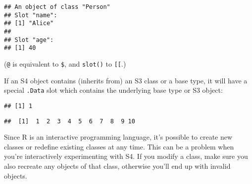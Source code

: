 \begin{Shaded}
\begin{Highlighting}[]
\NormalTok{)}
\end{Highlighting}
\end{Shaded}

\begin{verbatim}
## An object of class "Person"
## Slot "name":
## [1] "Alice"
## 
## Slot "age":
## [1] 40
\end{verbatim}

(\texttt{@} is equivalent to \texttt{\$}, and \texttt{slot()} to
\texttt{{[}{[}}.)

If an S4 object contains (inherits from) an S3 class or a base type, it
will have a special \texttt{.Data} slot which contains the underlying
base type or S3 object: 

\begin{Shaded}
\begin{Highlighting}[]
\NormalTok{(}\NormalTok{,}
   \NormalTok{,}
   \NormalTok{(} \NormalTok{, } \NormalTok{))}
\StringTok{ }\NormalTok{(}\NormalTok{, }\OperatorTok{:}\NormalTok{, } \NormalTok{, } \NormalTok{)}
\end{Highlighting}
\end{Shaded}

\begin{verbatim}
## [1] 1
\end{verbatim}

\begin{Shaded}
\begin{Highlighting}[]
\end{Highlighting}
\end{Shaded}

\begin{verbatim}
##  [1]  1  2  3  4  5  6  7  8  9 10
\end{verbatim}

Since R is an interactive programming language, it's possible to create
new classes or redefine existing classes at any time. This can be a
problem when you're interactively experimenting with S4. If you modify a
class, make sure you also recreate any objects of that class, otherwise
you'll end up with invalid objects.


